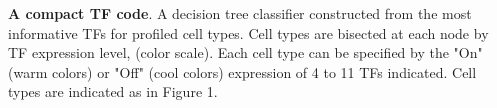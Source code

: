 \textbf{A compact TF code}. A decision tree classifier constructed from the most informative TFs for profiled cell types. Cell types are bisected at each node by TF expression level, (color scale). Each cell type can be specified by the "On" (warm colors) or "Off" (cool colors) expression of 4 to 11 TFs indicated. Cell types are indicated as in Figure 1.
